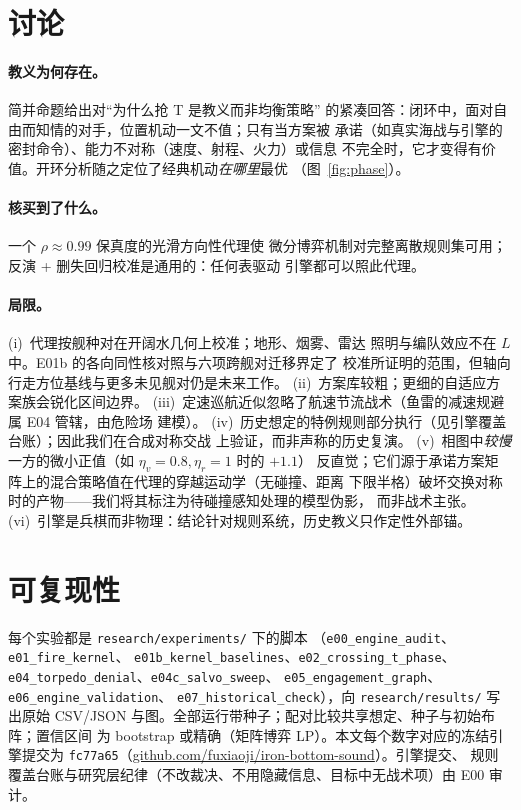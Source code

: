 \documentclass[12pt,a4paper]{ctexart}
\newcommand{\etav}{\eta_v}
\newcommand{\etar}{\eta_r}
\begin{document}
\section{讨论}\label{sec:discussion}

\paragraph{教义为何存在。} 简并命题给出对``为什么抢 T 是教义而非均衡策略''
的紧凑回答：闭环中，面对自由而知情的对手，位置机动一文不值；只有当方案被
承诺（如真实海战与引擎的密封命令）、能力不对称（速度、射程、火力）或信息
不完全时，它才变得有价值。开环分析随之定位了经典机动\emph{在哪里}最优
（图~\ref{fig:phase}）。

\paragraph{核买到了什么。} 一个 $\rho\approx0.99$ 保真度的光滑方向性代理使
微分博弈机制对完整离散规则集可用；反演 + 删失回归校准是通用的：任何表驱动
引擎都可以照此代理。

\paragraph{局限。} (i)~代理按舰种对在开阔水几何上校准；地形、烟雾、雷达
照明与编队效应不在 $L$ 中。E01b 的各向同性核对照与六项跨舰对迁移界定了
校准所证明的范围，但轴向行走方位基线与更多未见舰对仍是未来工作。
(ii)~方案库较粗；更细的自适应方案族会锐化区间边界。
(iii)~定速巡航近似忽略了航速节流战术（鱼雷的减速规避属 E04 管辖，由危险场
建模）。
(iv)~历史想定的特例规则部分执行（见引擎覆盖台账）；因此我们在合成对称交战
上验证，而非声称的历史复演。
(v)~相图中\emph{较慢}一方的微小正值（如 $\etav=0.8,\etar=1$ 时的 $+1.1$）
反直觉；它们源于承诺方案矩阵上的混合策略值在代理的穿越运动学（无碰撞、距离
下限半格）破坏交换对称时的产物——我们将其标注为待碰撞感知处理的模型伪影，
而非战术主张。
(vi)~引擎是兵棋而非物理：结论针对规则系统，历史教义只作定性外部锚。

\section{可复现性}\label{sec:repro}
每个实验都是 \texttt{research/experiments/} 下的脚本
（\texttt{e00\_engine\_audit}、\texttt{e01\_fire\_kernel}、
\texttt{e01b\_kernel\_baselines}、\texttt{e02\_crossing\_t\_phase}、
\texttt{e04\_torpedo\_denial}、\texttt{e04c\_salvo\_sweep}、
\texttt{e05\_engagement\_graph}、\texttt{e06\_engine\_validation}、
\texttt{e07\_historical\_check}），向 \texttt{research/results/} 写出原始
CSV/JSON 与图。全部运行带种子；配对比较共享想定、种子与初始布阵；置信区间
为 bootstrap 或精确（矩阵博弈 LP）。本文每个数字对应的冻结引擎提交为
\texttt{fc77a65}（\url{github.com/fuxiaoji/iron-bottom-sound}）。引擎提交、
规则覆盖台账与研究层纪律（不改裁决、不用隐藏信息、目标中无战术项）由 E00
审计。
\end{document}

